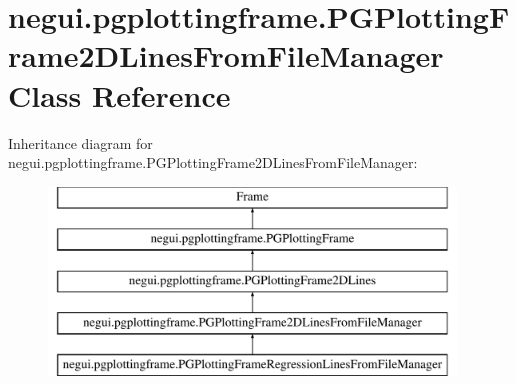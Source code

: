 \hypertarget{classnegui_1_1pgplottingframe_1_1PGPlottingFrame2DLinesFromFileManager}{}\section{negui.\+pgplottingframe.\+P\+G\+Plotting\+Frame2\+D\+Lines\+From\+File\+Manager Class Reference}
\label{classnegui_1_1pgplottingframe_1_1PGPlottingFrame2DLinesFromFileManager}
Inheritance diagram for negui.\+pgplottingframe.\+P\+G\+Plotting\+Frame2\+D\+Lines\+From\+File\+Manager\+:\begin{figure}[H]
\begin{center}
\leavevmode
\includegraphics[height=5.000000cm]{classnegui_1_1pgplottingframe_1_1PGPlottingFrame2DLinesFromFileManager}
\end{center}
\end{figure}
